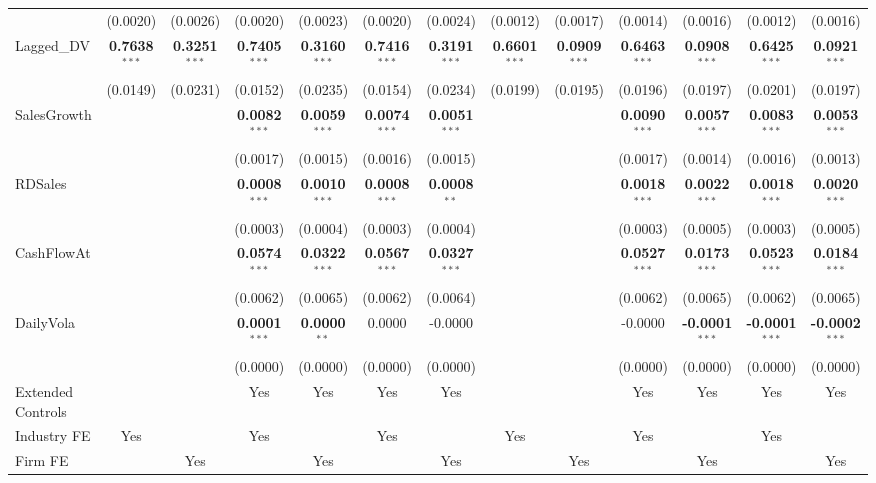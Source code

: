 \documentclass[11pt,a4paper]{article}
\begin{document}
\begin{table}[htbp]
\begin{tabular}{lcccccccccccc}
 & (0.0020) & (0.0026) & (0.0020) & (0.0023) & (0.0020) & (0.0024) & (0.0012) & (0.0017) & (0.0014) & (0.0016) & (0.0012) & (0.0016) \\
Lagged\_DV & \textbf{0.7638}$^{***}$ & \textbf{0.3251}$^{***}$ & \textbf{0.7405}$^{***}$ & \textbf{0.3160}$^{***}$ & \textbf{0.7416}$^{***}$ & \textbf{0.3191}$^{***}$ & \textbf{0.6601}$^{***}$ & \textbf{0.0909}$^{***}$ & \textbf{0.6463}$^{***}$ & \textbf{0.0908}$^{***}$ & \textbf{0.6425}$^{***}$ & \textbf{0.0921}$^{***}$ \\
 & (0.0149) & (0.0231) & (0.0152) & (0.0235) & (0.0154) & (0.0234) & (0.0199) & (0.0195) & (0.0196) & (0.0197) & (0.0201) & (0.0197) \\
SalesGrowth &  &  & \textbf{0.0082}$^{***}$ & \textbf{0.0059}$^{***}$ & \textbf{0.0074}$^{***}$ & \textbf{0.0051}$^{***}$ &  &  & \textbf{0.0090}$^{***}$ & \textbf{0.0057}$^{***}$ & \textbf{0.0083}$^{***}$ & \textbf{0.0053}$^{***}$ \\
 &  &  & (0.0017) & (0.0015) & (0.0016) & (0.0015) &  &  & (0.0017) & (0.0014) & (0.0016) & (0.0013) \\
RDSales &  &  & \textbf{0.0008}$^{***}$ & \textbf{0.0010}$^{***}$ & \textbf{0.0008}$^{***}$ & \textbf{0.0008}$^{**}$ &  &  & \textbf{0.0018}$^{***}$ & \textbf{0.0022}$^{***}$ & \textbf{0.0018}$^{***}$ & \textbf{0.0020}$^{***}$ \\
 &  &  & (0.0003) & (0.0004) & (0.0003) & (0.0004) &  &  & (0.0003) & (0.0005) & (0.0003) & (0.0005) \\
CashFlowAt &  &  & \textbf{0.0574}$^{***}$ & \textbf{0.0322}$^{***}$ & \textbf{0.0567}$^{***}$ & \textbf{0.0327}$^{***}$ &  &  & \textbf{0.0527}$^{***}$ & \textbf{0.0173}$^{***}$ & \textbf{0.0523}$^{***}$ & \textbf{0.0184}$^{***}$ \\
 &  &  & (0.0062) & (0.0065) & (0.0062) & (0.0064) &  &  & (0.0062) & (0.0065) & (0.0062) & (0.0065) \\
DailyVola &  &  & \textbf{0.0001}$^{***}$ & \textbf{0.0000}$^{**}$ & 0.0000 & -0.0000 &  &  & -0.0000 & \textbf{-0.0001}$^{***}$ & \textbf{-0.0001}$^{***}$ & \textbf{-0.0002}$^{***}$ \\
 &  &  & (0.0000) & (0.0000) & (0.0000) & (0.0000) &  &  & (0.0000) & (0.0000) & (0.0000) & (0.0000) \\
\midrule
Extended Controls &  &  & Yes & Yes & Yes & Yes &  &  & Yes & Yes & Yes & Yes \\
Industry FE & Yes &  & Yes &  & Yes &  & Yes &  & Yes &  & Yes &  \\
Firm FE &  & Yes &  & Yes &  & Yes &  & Yes &  & Yes &  & Yes \\

\end{tabular}
\end{table}
\end{document}
